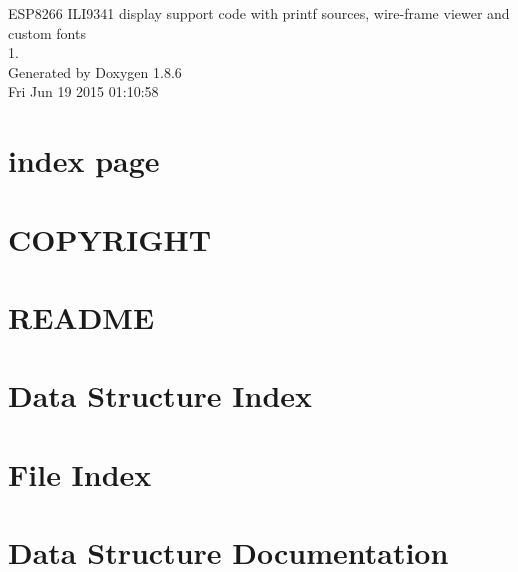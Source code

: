 \documentclass[twoside]{book}
\newcommand{\clearemptydoublepage}{%
  \newpage{\pagestyle{empty}\cleardoublepage}%
}
\begin{document}
\hypersetup{pageanchor=false}
\begin{titlepage}
\vspace*{7cm}
\begin{center}%
{\Large E\-S\-P8266 I\-L\-I9341 display support code with printf sources, wire-\/frame viewer and custom fonts \\[1ex]\large 1. }\\
\vspace*{1cm}
{\large Generated by Doxygen 1.8.6}\\
\vspace*{0.5cm}
{\small Fri Jun 19 2015 01:10:58}\\
\end{center}
\end{titlepage}
\clearemptydoublepage
\tableofcontents
\clearemptydoublepage
{}
\hypersetup{pageanchor=true}

\chapter{index page}
\label{index}\hypertarget{index}{}
\chapter{C\-O\-P\-Y\-R\-I\-G\-H\-T}
\label{md_COPYRIGHT}
\hypertarget{md_COPYRIGHT}{}

\chapter{R\-E\-A\-D\-M\-E}
\label{md_README}
\hypertarget{md_README}{}

\chapter{Data Structure Index}

\chapter{File Index}

\chapter{Data Structure Documentation}














\end{document}
